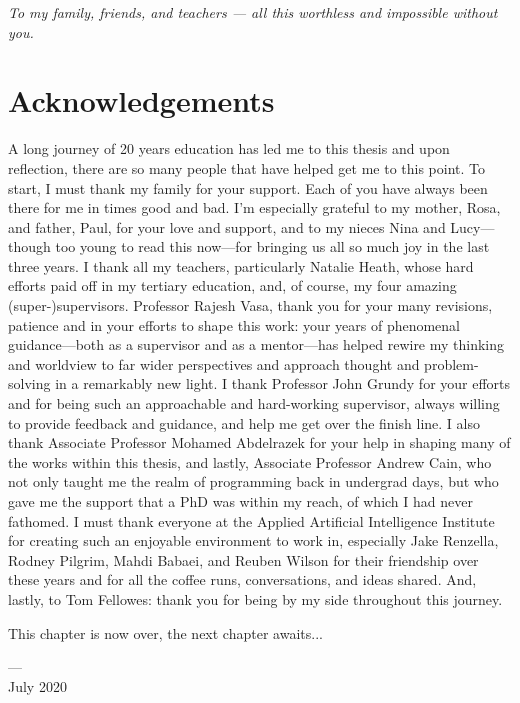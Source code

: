 \cleardoublepage
\pagestyle{empty}
\begin{center}
  \vspace*{0.3\paperheight}
  \textit{To my family, friends, and teachers --- all this worthless and impossible without you.}
\end{center}
\pagestyle{fancy}

\chapter*{Acknowledgements}

\vspace{-2\bigskipamount}

A long journey of 20 years education has led me to this thesis and upon reflection, there are so many people that have helped get me to this point. To start, I must thank my family for your support. Each of you have always been there for me in times good and bad. I'm especially grateful to my mother, Rosa, and father, Paul, for your love and support, and to my nieces Nina and Lucy---though too young to read this now---for bringing us all so much joy in the last three years. I thank all my teachers, particularly Natalie Heath, whose hard efforts paid off in my tertiary education, and, of course, my four amazing (super-)supervisors. Professor Rajesh Vasa, thank you for your many revisions, patience and in your efforts to shape this work: your years of phenomenal guidance---both as a supervisor and as a mentor---has helped rewire my thinking and worldview to far wider perspectives and approach thought and problem-solving in a remarkably new light. I thank Professor John Grundy for your efforts and for being such an approachable and hard-working supervisor, always willing to provide feedback and guidance, and help me get over the finish line. I also thank Associate Professor Mohamed Abdelrazek for your help in shaping many of the works within this thesis, and lastly, Associate Professor Andrew Cain, who not only taught me the realm of programming back in undergrad days, but who gave me the support that a PhD was within my reach, of which I had never fathomed. I must thank everyone at the Applied Artificial Intelligence Institute for creating such an enjoyable environment to work in, especially Jake Renzella, Rodney Pilgrim, Mahdi Babaei, and Reuben Wilson for their friendship over these years and for all the coffee runs, conversations, and ideas shared. And, lastly, to Tom Fellowes: thank you for being by my side throughout this journey. 

\bigskip
\noindent
This chapter is now over, the next chapter awaits...

\bigskip
\noindent
\hspace{\fill}
\parbox[b]{0.4\linewidth}{
\raggedleft
\small
--- \theauthor{}\\
July 2020
}